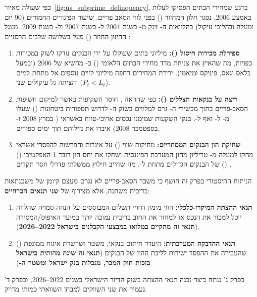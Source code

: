 כפי שעולה מאיור~\ref{fig:us_subprime_delinquency}, ברגע שמחירי הבתים הפסיקו לעלות באמצע \num{2006}, נסגר חלון המחזור () בפני לווי הסאב-פריים. שיעור הפיגורים החמורים (\num{90} יום ומעלה ובהליכי עיקול) בהלוואות ה- זינק מ- בשנת \num{2004} ל- בשנת \num{2007} ול- בשנת \num{2009}. מעגל ההיזון החוזר () פעל בשלושה שלבים הרסניים \cite{mian2009consequences,gorton2009securitized}:
\begin{enumerate}[label=\textbf{\arabic*.},rightmargin=0.6cm]
  \item \textbf{ספירלת מכירות חיסול ():} מיליוני בתים שעוקלו על ידי הבנקים נזרקו לשוק במכירות כפויות, מה שהאיץ את צניחת מדד מחירי הבתים הלאומי () ב- מהשיא של \num{2006} (ובמעל  בלאס וגאס, פיניקס ומיאמי). ירידת המחירים דחפה מיליוני לווים נוספים אל מתחת למים ($P_t < L_t$) והציתה גל עיקולים שני.
  \item \textbf{ריצה על בנקאות הצללים ():} כפי שהראה  \cite{gorton2009securitized}, חוסר השקיפות באשר למיקום חשיפות הסאב-פריים בתוך מכשירי ה- גרם למלווים בשוק ה- לדרוש תספורות ביטחונות () שעלו מ- ל- ואף ל-. בנקי השקעות שמימנו נכסים ארוכי-טווח באשראי  ( במרץ \num{2008} ו- בספטמבר \num{2008}) איבדו את נזילותם תוך ימים ספורים.
  \item \textbf{שחיקת הון הבנקים המסחריים:} מחיקות שווי () על איגרות  והפרשות להפסדי אשראי מחקו למעלה מ- טריליון מהון המערכת הפיננסית ושחקו את יחס הון רובד \num{1} האפקטיבי () של הבנקים הגדולים מתחת ל-, מה שחייב חילוץ ממשלתי פדרלי חסר תקדים () \cite{reinhart2009this,bernanke2010monetary}.
\end{enumerate}

\begin{projectbox}
הניתוח ההיסטורי בפרק זה חושף כי משבר הסאב-פריים לא נגרם מעצם קיומן של משכנתאות בריבית משתנה, אלא מצירוף של \textbf{שני תנאים הכרחיים}:
\begin{enumerate}[label=\textbf{(\alph*)},rightmargin=0.5cm]
  \item \textbf{תנאי ההצתה המיקרו-כלכלי:} חוזי מימון דחויי-תשלום המבוססים על הנחה סמויה שהלווה יוכל למכור את הנכס או למחזר את החוב בריבית נמוכה יותר במועד האיפוס/המסירה (\textbf{תנאי זה מתקיים במלואו במבצעי הקבלנים בישראל \num{2022}--\num{2026}}).
  \item \textbf{תנאי ההדבקה המערכתית:} היעדר חיתום בנקאי, משטר  ושרשרת איגוח ממונפת () שהעבירה את ההפסד ישירות לליבת ההון של הבנקים (\textbf{תנאי זה שונה מהותית בישראל בזכות חוק המכר, מגבלות בנק ישראל ומשטר ה-}).
\end{enumerate}
בפרק ג' ננתח כיצד נבנה תנאי ההצתה בשוק הדיור הישראלי בשנים \num{2022}--\num{2026}, ובפרק ד' נעמיד את שני השווקים למבחן השוואתי כמותי מדויק.
\end{projectbox}
